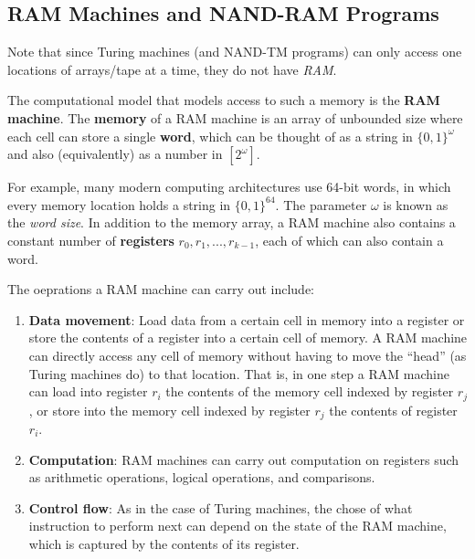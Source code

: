 \documentclass{article}
\begin{document}
  \subsection{RAM Machines and NAND-RAM Programs}
  Note that since Turing machines (and NAND-TM programs) can only access one locations of arrays/tape at a time, they do not have \textit{RAM}.

  \begin{definition}
  The computational model that models access to such a memory is the \textbf{RAM machine}. The \textbf{memory} of a RAM machine is an array of unbounded size where each cell can store a single \textbf{word}, which can be thought of as a string in $\{0,1\}^\omega$ and also (equivalently) as a number in $[2^\omega]$. 
  \end{definition}

  For example, many modern computing architectures use 64-bit words, in which every memory location holds a string in $\{0,1\}^{64}$. The parameter $\omega$ is known as the \textit{word size}. In addition to the memory array, a RAM machine also contains a constant number of \textbf{registers} $r_0, r_1, ..., r_{k-1}$, each of which can also contain a word. 

  The oeprations a RAM machine can carry out include: 
  \begin{enumerate}
      \item \textbf{Data movement}: Load data from a certain cell in memory into a register or store the contents of a register into a certain cell of memory. A RAM machine can directly access any cell of memory without having to move the “head” (as Turing machines do) to that location. That is, in one step a RAM machine can load into register $r_i$ the contents of the memory cell indexed by register $r_j$, or store into the memory cell indexed by register $r_j$ the contents of register $r_i$. 
      \item \textbf{Computation}: RAM machines can carry out computation on registers such as arithmetic operations, logical operations, and comparisons. 
      \item \textbf{Control flow}: As in the case of Turing machines, the chose of what instruction to perform next can depend on the state of the RAM machine, which is captured by the contents of its register. 
  \end{enumerate}
\end{document}
